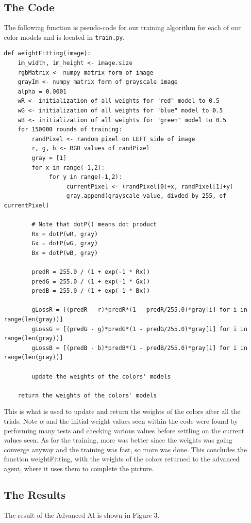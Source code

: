 \documentclass[11pt]{article}
\begin{document}
\subsection{The Code}
The following function is pseudo-code for our training algorithm for each of our color models and is located in \verb|train.py|.
\begin{verbatim}
def weightFitting(image):
    im_width, im_height <- image.size
    rgbMatrix <- numpy matrix form of image
    grayIm <- numpy matrix form of grayscale image
    alpha = 0.0001
    wR <- initialization of all weights for "red" model to 0.5
    wG <- initialization of all weights for "blue" model to 0.5
    wB <- initialization of all weights for "green" model to 0.5
    for 150000 rounds of training:
        randPixel <- random pixel on LEFT side of image
        r, g, b <- RGB values of randPixel
        gray = [1]
        for x in range(-1,2):
             for y in range(-1,2):
                  currentPixel <- (randPixel[0]+x, randPixel[1]+y) 
                  gray.append(grayscale value, divded by 255, of currentPixel)
                  
        # Note that dotP() means dot product
        Rx = dotP(wR, gray)
        Gx = dotP(wG, gray)
        Bx = dotP(wB, gray)

        predR = 255.0 / (1 + exp(-1 * Rx))
        predG = 255.0 / (1 + exp(-1 * Gx))
        predB = 255.0 / (1 + exp(-1 * Bx))

        gLossR = [(predR - r)*predR*(1 - predR/255.0)*gray[i] for i in range(len(gray))]
        gLossG = [(predG - g)*predG*(1 - predG/255.0)*gray[i] for i in range(len(gray))]
        gLossB = [(predB - b)*predB*(1 - predB/255.0)*gray[i] for i in range(len(gray))]

        update the weights of the colors' models
        
    return the weights of the colors' models
\end{verbatim}

This is what is used to update and return the weights of the colors after all the trials. Note $\alpha$ and the initial weight values seen within the code were found by performing many tests and checking various values before settling on the current values seen. As for the training, more was better since the weights was going converge anyway and the training was fast, so more was done. This concludes the function weightFitting, with the weights of the colors returned to the advanced agent, where it uses them to complete the picture.
\pagebreak
\subsection{The Results}
The result of the Advanced AI is shown in Figure 3.
\end{document}
